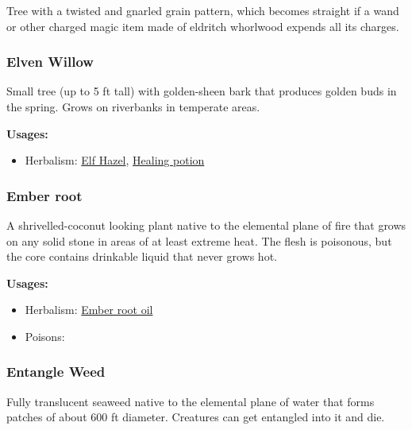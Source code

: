 Tree with a twisted and gnarled grain pattern, which becomes straight if a wand or other charged magic item made of eldritch whorlwood expends all its charges.

\subsubsection{Elven Willow}
\label{Elven Willow}

Small tree (up to 5 ft tall) with golden-sheen bark that produces golden buds in the spring. Grows on riverbanks in temperate areas.

\vspace{5mm}

\textbf{Usages:}

\begin{itemize}[noitemsep]
\item[] Herbalism: \hyperref[Elf Hazel]{Elf Hazel}, \hyperref[healing_potion]{Healing potion}
\end{itemize}

\subsubsection{Ember root}
\label{Ember root}

A shrivelled-coconut looking plant native to the elemental plane of fire that grows on any solid stone in areas of at least extreme heat. The flesh is poisonous, but the core contains drinkable liquid that never grows hot.

\vspace{5mm}

\textbf{Usages:}

\begin{itemize}[noitemsep]
\item[] Herbalism: \hyperref[Ember root oil]{Ember root oil}
\item[] Poisons: \poison
\end{itemize}

\subsubsection{Entangle Weed}
\label{Entangle Weed}

Fully translucent seaweed native to the elemental plane of water that forms patches of about 600 ft diameter. Creatures can get entangled into it and die.

\vspace{5mm}

